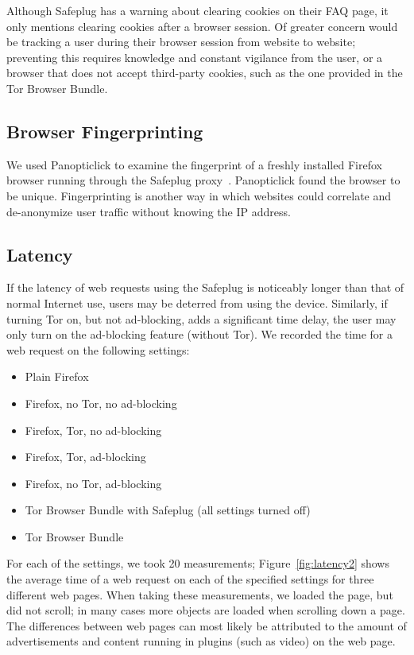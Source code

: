 \documentclass[conference]{IEEEtran}
\begin{document}
Although Safeplug has a warning about clearing cookies on their FAQ page, it only mentions clearing cookies after a browser session.  Of greater concern would be tracking a user during their browser session from website to website; preventing this requires knowledge and constant vigilance from the user, or a browser that does not accept third-party cookies, such as the one provided in the Tor Browser Bundle.

\subsection{Browser Fingerprinting}
We used Panopticlick to examine the fingerprint of a freshly installed Firefox browser running through the Safeplug proxy~\cite{panopticlick}.  Panopticlick found the browser to be unique.  Fingerprinting is another way in which websites could correlate and de-anonymize user traffic without knowing the IP address.

\subsection{Latency}
If the latency of web requests using the Safeplug is noticeably longer than that of normal Internet use, users may be deterred from using the device.  Similarly, if turning Tor on, but not ad-blocking, adds a significant time delay, the user may only turn on the ad-blocking feature (without Tor).  We recorded the time for a web request on the following settings:

\begin{itemize}
\item Plain Firefox
\item Firefox, no Tor, no ad-blocking
\item Firefox, Tor, no ad-blocking
\item Firefox, Tor, ad-blocking
\item Firefox, no Tor, ad-blocking
\item Tor Browser Bundle with Safeplug (all settings turned off)
\item Tor Browser Bundle
\end{itemize}

For each of the settings, we took 20 measurements; Figure~\ref{fig:latency2} shows the average time of a web request on each of the specified settings for three different web pages.  When taking these measurements, we loaded the page, but did not scroll; in many cases more objects are loaded when scrolling down a page.  The differences between web pages can most likely be attributed to the amount of advertisements and content running in plugins (such as video) on the web page.  
\end{document}
